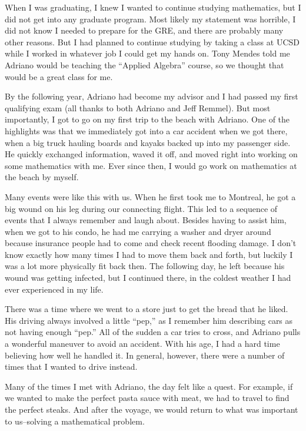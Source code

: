 \documentclass{amsart}
\begin{document}
When I was graduating, I knew I wanted to continue studying mathematics, but I did not get into any graduate program. Most likely my statement was horrible, I did not know I needed to prepare for the GRE, and there are probably many other reasons. But I had planned to continue studying by taking a class at UCSD while I worked in whatever job I could get my hands on. Tony Mendes told me Adriano would be teaching the ``Applied Algebra'' course, so we thought that would be a great class for me.

By the following year, Adriano had become my advisor and I had passed my first qualifying exam (all thanks to both Adriano and Jeff Remmel). But most importantly, I got to go on my first trip to the beach with Adriano. One of the highlights was that we immediately got into a car accident when we got there, when a big truck hauling boards and kayaks backed up into my passenger side. He quickly exchanged information, waved it off, and moved right into working on some mathematics with me. Ever since then, I would go work on mathematics at the beach by myself. 


Many events were like this with us. When he first took me to Montreal, he got a big wound on his leg during our connecting flight. This led to a sequence of events that I always remember and laugh about. Besides having to assist him, when we got to his condo, he had me carrying a washer and dryer around because insurance people had to come and check recent flooding damage. I don't know exactly how many times I had to move them back and forth, but luckily I was a lot more physically fit back then. 
The following day, he left because his wound was getting infected, but I continued there, in the coldest weather I had ever experienced in my life. 

There was a time where we went to a store just to get the bread that he liked. His driving always involved a little ``pep,'' as I remember him describing cars as not having enough ``pep.'' All of the sudden a car tries to cross, and Adriano pulls a wonderful maneuver to avoid an accident. With his age, I had a hard time believing how well he handled it. In general, however, there were a number of times that I wanted to drive instead.

Many of the times I met with Adriano, the day felt like a quest. For example, if we wanted to make the perfect pasta sauce with meat, we had to travel to find the perfect steaks. And after the voyage, we would return to what was important to us--solving a mathematical problem. 
\end{document}
